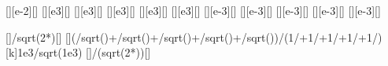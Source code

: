 [\cm][e-2][\m]
[\kilo\volt][e3][\V]
[\kilo\volt][e3][\V]
[\kilo\volt][e3][\V]
[\kilo\volt][e3][\V]
[\kilo\volt][e3][\V]
[\mm][e-3][\m]
[\mm][e-3][\m]
[\mm][e-3][\m]
[\mm][e-3][\m]
[\mm][e-3][\m]

[]{\nchX/sqrt(2*\ncmeX*\nceX*\UAX)}[\m]
[]{(\rAX/sqrt(\UAX)+\rBX/sqrt(\UBX)+\rCX/sqrt(\UCX)+\rDX/sqrt(\UDX)+\rEX/sqrt(\UEX))/(1/\UAX+1/\UBX+1/\UCX+1/\UDX+1/\UEX)}
[k]{\slX*1e3/sqrt(1e3)}
[]{\LsX*\nchX/(\slX*sqrt(2*\ncmeX*\nceX))}[\m]
